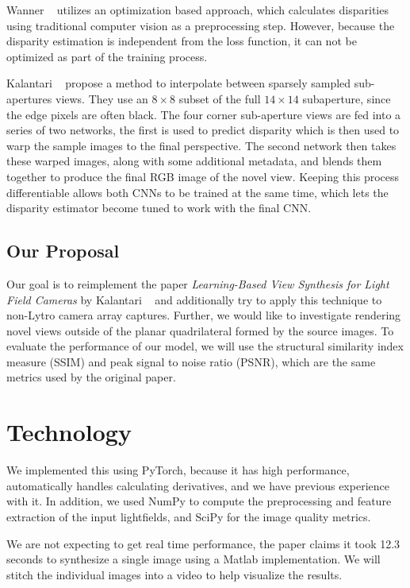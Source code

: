 \documentclass[10pt,twocolumn,letterpaper]{article}
\begin{document}
Wanner \etal~\cite{Wanner} utilizes an optimization based approach, which calculates disparities
using traditional computer vision as a preprocessing step. However, because the disparity estimation
is independent from the loss function, it can not be optimized as part of the training process. 

Kalantari \etal~\cite{LearningViewSynthesis} propose a method to interpolate between 
sparsely sampled sub-apertures views. They use an $8 \times 8$ subset of the full $14 \times 14$ subaperture, since the
edge pixels are often black. The four corner sub-aperture views are fed into a series of two 
networks, the first is used to predict disparity which is then used to warp the sample images to the final perspective.
The second network then takes these warped images, along with some additional metadata, and blends them together
to produce the final RGB image of the novel view. Keeping this process differentiable allows both CNNs to 
be trained at the same time, which lets the disparity estimator become tuned to work with the final CNN.

\subsection{Our Proposal}

Our goal is to reimplement the paper \textit{Learning-Based View Synthesis for Light Field Cameras} by 
Kalantari \etal~\cite{LearningViewSynthesis} and additionally try to apply this technique to non-Lytro camera
array captures. Further, we would like to investigate rendering novel views outside of the planar
quadrilateral formed by the source images. To evaluate the performance of our model, we will use 
the structural similarity index measure (SSIM) and peak signal to noise ratio (PSNR), which are the 
same metrics used by the original paper.

\section{Technology}

We implemented this using PyTorch, because it has high performance,
automatically handles calculating derivatives, and we have previous experience with it.
In addition, we used NumPy to compute the preprocessing and feature extraction of the input lightfields,
and SciPy for the image quality metrics.

We are not expecting to get real time performance, the paper claims it took 12.3 seconds to synthesize
a single image using a Matlab implementation. We will stitch the individual images into a video to
help visualize the results.
\end{document}
